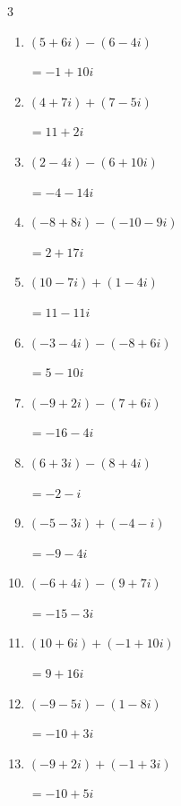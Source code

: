 \begin{multicols}{3}
\begin{enumerate}
        $\displaystyle =13-14i$

  \item $\displaystyle (5+6i) - (6-4i)$

        $\displaystyle =-1+10i$

  \item $\displaystyle (4+7i) + (7-5i)$

        $\displaystyle =11+2i$

  \item $\displaystyle (2-4i) - (6+10i)$

        $\displaystyle =-4-14i$

  \item $\displaystyle (-8+8i) - (-10-9i)$

        $\displaystyle =2+17i$

  \item $\displaystyle (10-7i) + (1-4i)$

        $\displaystyle =11-11i$

  \item $\displaystyle (-3-4i) - (-8+6i)$

        $\displaystyle =5-10i$

\columnbreak %

  \item $\displaystyle (-9+2i) - (7+6i)$

        $\displaystyle =-16-4i$

  \item $\displaystyle (6+3i) - (8+4i)$

        $\displaystyle =-2-i$

  \item $\displaystyle (-5-3i) + (-4-i)$

        $\displaystyle =-9-4i$

  \item $\displaystyle (-6+4i) - (9+7i)$

        $\displaystyle =-15-3i$

  \item $\displaystyle (10+6i) + (-1+10i)$

        $\displaystyle =9+16i$

  \item $\displaystyle (-9-5i) - (1-8i)$

        $\displaystyle =-10+3i$

  \item $\displaystyle (-9+2i) + (-1+3i)$

        $\displaystyle =-10+5i$


\end{enumerate}
\end{multicols}
